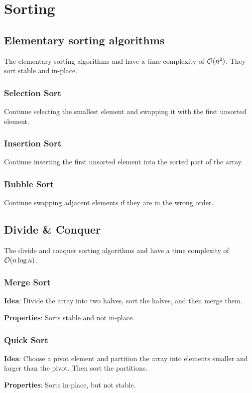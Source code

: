 \documentclass{article}
\begin{document}
\section{Sorting}
\subsection{Elementary sorting algorithms}
The elementary sorting algorithms   and  have a time complexity of $\mathcal{O}(n^2)$. They sort stable and in-place.
\subsubsection{Selection Sort}
Continue selecting the smallest element and swapping it with the first unsorted element.\par


\subsubsection{Insertion Sort}
Continue inserting the first unsorted element into the sorted part of the array.\par


\subsubsection{Bubble Sort}
Continue swapping adjacent elements if they are in the wrong order.\par


\subsection{Divide \& Conquer}
The divide and conquer sorting algorithms  and  have a time complexity of $\mathcal{O}(n\log n)$.
\subsubsection{Merge Sort}
\textbf{Idea}: Divide the array into two halves, sort the halves, and then merge them.\par
\textbf{Properties}: Sorts stable and not in-place.\par


\subsubsection{Quick Sort}
\textbf{Idea}: Choose a pivot element and partition the array into elements smaller and larger than the pivot. Then sort the partitions.\par
\textbf{Properties}: Sorts in-place, but not stable.\par

\end{document}
